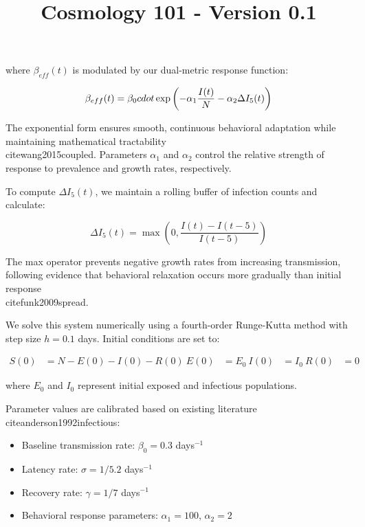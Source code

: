 \documentclass{article}\usepackage{graphicx} \usepackage{amsmath} \usepackage{colortbl}\title{Cosmology 101 - Version 0.1}
\begin{document}
where $\beta_{eff}(t)$ is modulated by our dual-metric response function:

\begin{equation}
\beta_{eff}(t) = \beta_0 \\cdot \exp\left(-\alpha_1\frac{I(t)}{N} - \alpha_2\Delta I_5(t)\right)
\end{equation}

The exponential form ensures smooth, continuous behavioral adaptation while maintaining mathematical tractability \\cite{wang2015coupled}. Parameters $\alpha_1$ and $\alpha_2$ control the relative strength of response to prevalence and growth rates, respectively.

To compute $\Delta I_5(t)$, we maintain a rolling buffer of infection counts and calculate:

\begin{equation}
\Delta I_5(t) = \max\left(0, \frac{I(t) - I(t-5)}{I(t-5)}\right)
\end{equation}

The max operator prevents negative growth rates from increasing transmission, following evidence that behavioral relaxation occurs more gradually than initial response \\cite{funk2009spread}.

We solve this system numerically using a fourth-order Runge-Kutta method with step size $h=0.1$ days. Initial conditions are set to:

\begin{equation}
\begin{aligned}
S(0) &= N - E(0) - I(0) - R(0) \
E(0) &= E_0 \
I(0) &= I_0 \
R(0) &= 0
\end{aligned}
\end{equation}

where $E_0$ and $I_0$ represent initial exposed and infectious populations.

Parameter values are calibrated based on existing literature \\cite{anderson1992infectious}:
\begin{itemize}
    \item Baseline transmission rate: $\beta_0 = 0.3$ days$^{-1}$
    \item Latency rate: $\sigma = 1/5.2$ days$^{-1}$
    \item Recovery rate: $\gamma = 1/7$ days$^{-1}$
    \item Behavioral response parameters: $\alpha_1 = 100$, $\alpha_2 = 2$
\end{itemize}
\end{document}
